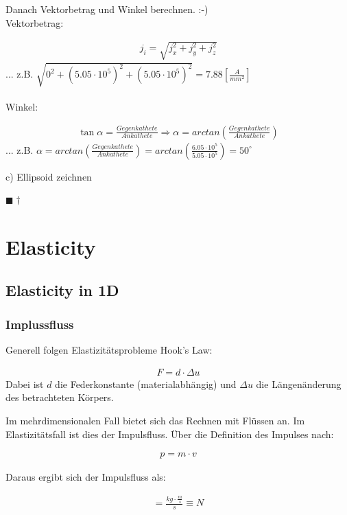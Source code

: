 \documentclass[a4paper, 10pt]{scrartcl}
\newcommand{\qed}{\begin{flushright}
		$\blacksquare \dagger$ \end{flushright}}
\begin{document}
Danach Vektorbetrag und Winkel berechnen. :-)\\

Vektorbetrag: 

\begin{align}
	j_i=\sqrt{j_x^2+j_y^2+j_z^2}
\end{align}
... z.B. $\sqrt{ 0^2+(5.05 \cdot 10^5)^2+(5.05 \cdot 10^5)^2 } = 7.88 [\frac{A}{mm^2}]$ 
\\
\\
Winkel:

\begin{align}
	\tan{\alpha}=\frac{Gegenkathete}{Ankathete} \Rightarrow \alpha=arctan(\frac{Gegenkathete}{Ankathete})
\end{align}
... z.B. $ \alpha=arctan(\frac{Gegenkathete}{Ankathete}) = arctan(\frac{6.05 \cdot 10^5}{5.05 \cdot 10^5}) = 50^\circ $


c) Ellipsoid zeichnen



\qed

\section{Elasticity}
\subsection{Elasticity in 1D}
\subsubsection{Implussfluss}
Generell folgen Elastizitätsprobleme Hook's Law:

\begin{align}
	F=d \cdot \Delta u
\end{align}
Dabei ist $d$ die Federkonstante (materialabhängig) und $\Delta u$ die
Längenänderung des betrachteten Körpers.

Im mehrdimensionalen Fall bietet sich das Rechnen mit Flüssen an. Im
Elastizitätsfall ist dies der Impulsfluss. Über die Definition des Impulses
nach:

\begin{align}
	p = m \cdot v
\end{align}

Daraus ergibt sich der Impulsfluss als:

\begin{align}
	[J_p]=\frac{kg \cdot \frac{m}{s}}{s} \equiv N
\end{align}
\end{document}
